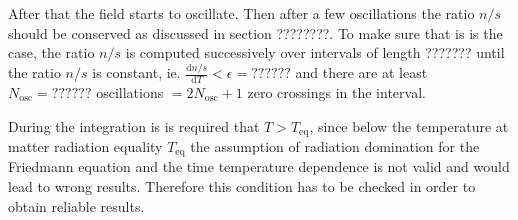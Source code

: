 \documentclass[a4paper, 12pt]{article}
\newcommand{\diff}{\mathrm{d}}
\begin{document}
\noindent
After that the field starts to oscillate.
Then after a few oscillations the ratio $n / s$ should be conserved as discussed in section ????????.
To make sure that is is the case, the ratio $n / s$ is computed successively over intervals of length ???????
until the ratio $n / s$ is constant, ie. $\frac{\diff n / s}{\diff T} < \epsilon = ??????$ and
there are at least $N_\mathrm{osc} = ??????$ oscillations $= 2 N_\mathrm{osc} + 1$ zero crossings in the interval.

\noindent
During the integration is is required that $T > T_\mathrm{eq}$, since below the temperature at matter radiation equality $T_\mathrm{eq}$
the assumption of radiation domination for the Friedmann equation and the time temperature dependence is not valid
and would lead to wrong results. Therefore this condition has to be checked in order to obtain reliable results.
\end{document}
